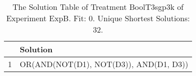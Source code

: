 \begin{table}[ht]
\centering
\begin{tabular}{rp{9cm}}
  \hline
 & Solution \\ 
  \hline
1 & OR(AND(NOT(D1), NOT(D3)), AND(D1, D3)) \\ 
   \hline
\end{tabular}
\caption{The Solution Table of Treatment BoolT3sgp3k of Experiment ExpB. Fit: 0. Unique Shortest Solutions: 32.} 
\end{table}

